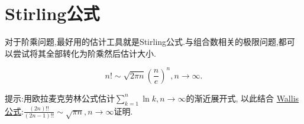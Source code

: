 \documentclass[../../main.tex]{subfiles}%
\begin{document}
\section{Stirling公式}

对于阶乘问题,最好用的估计工具就是Stirling公式.与组合数相关的极限问题,都可以尝试将其全部转化为阶乘然后估计大小.

\begin{theorem}[Stirling公式]\label{theorem:Stirling公式}
\[
n!\sim\sqrt{2\pi n}\left(\frac{n}{e}\right)^{n},n\to\infty.
\]
\end{theorem}
\begin{note}
提示:用欧拉麦克劳林公式估计\(\sum_{k = 1}^{n}\ln k,n\to\infty\)的渐近展开式, 以此结合 \hyperref[theorem:Wallis公式]{Wallis 公式}:\(\frac{(2n)!!}{(2n - 1)!!}\sim\sqrt{\pi n},n\to\infty\)证明.
\end{note}
\end{document}
